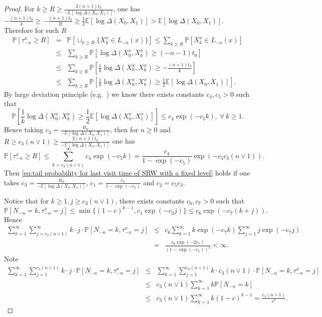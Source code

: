 \documentclass[12pt]{article}
\numberwithin{equation}{section}
\newcommand{\be}{\begin{equation}}
\newcommand{\ee}{\end{equation}}
\newcommand{\1}{\mathbf{1}}
\begin{document}
\begin{proof}
 	For $k\geq R\geq \frac{2(n+1)t_0}{-\mathbb{E}[\log\Delta(X_0,X_1)]}$, one has $-\frac{(n+1)t_0}{k}\geq -\frac{(n+1)t_0}{R}\geq \frac{1}{2}\mathbb{E}[\log\Delta(X_0,X_1)]>\mathbb{E}[\log\Delta(X_0,X_1)]$. Therefore
 	for such $R$
 	\begin{eqnarray*}
 		\mathbb{P}[\tau_{-n}^x\geq R]&=&\mathbb{P}[\cup_{k\geq R}\{ X_{k}^x\in L_{-n}(x) \}]\leq\sum_{k\geq R}\mathbb{P}[X_{k}^x\in L_{-n}(x)]\\
 		&\leq&\sum_{k\geq R}\mathbb{P}[\log\Delta(X_0^x,X_k^x)\geq (-n-1)t_0]\\
 		&\leq&\sum_{k\geq R}\mathbb{P}\left[\frac{1}{k}\log\Delta(X_0^x,X_k^x)\geq -\frac{(n+1)t_0}{k}\right]\\
 		&\leq&\sum_{k\geq R}\mathbb{P}\left[\frac{1}{k}\log\Delta(X_0^x,X_k^x)\geq \frac{1}{2}\mathbb{E}[\log\Delta(X_0,X_1)]\right].
 	\end{eqnarray*}
 	By large deviation principle (e.g.\ \cite[Theorem 2.7.7]{Durrett2010}) we know there exists constants $c_4,c_5>0$ such that 
 	\be
 	\mathbb{P}\left[\frac{1}{k}\log\Delta(X_0^x,X_k^x)\geq \frac{1}{2}\mathbb{E}[\log\Delta(X_0^x,X_1^x)]\right]
 	\leq c_4\exp(-c_5k),\ \forall \ k\geq1.
 	\ee
 	Hence taking $c_3=\frac{4t_0}{-\mathbb{E}[\log\Delta(X_0,X_1)]}$, then for $n\geq0$ and $R\geq c_3(n\vee 1)\geq \frac{2(n+1)t_0}{-\mathbb{E}[\log\Delta(X_0,X_1)]}$ one has 
 	\be 
 	\mathbb{P}[\tau_{-n}^x\geq R]\leq \sum_{k=c_3(n\vee1)}^{\infty} c_4\exp(-c_5k) =\frac{c_4}{1-\exp(-c_5)}\exp(-c_5c_3(n\vee 1)).
 	\ee
 	Then \eqref{eq:tail probability for last visit time of SRW with a fixed level} holds if one takes $c_3=\frac{4t_0}{-\mathbb{E}[\log\Delta(X_0,X_1)]}$, $c_1=\frac{c_4}{1-\exp(-c_5)}$ and $c_2=c_5c_3$. 
 	
 	
 	
 	Notice that for $k\geq 1,j\geq c_3(n\vee 1)$, there exists  constants $c_6,c_7>0$ such that 
 	\be\label{eq: exponential decay for N_-n,tau-n large}
 	\mathbb{P}[N_{-n}=k,\tau_{-n}^x=j]\leq \min\{(1-c)^{k-1},c_1\exp(-c_2j) \}\leq c_6\exp(-c_7(k+j)).
 	\ee
 	Hence 
 	\begin{eqnarray}\label{eq: tau large part}
 	\sum_{k=1}^{\infty}\sum_{j=c_3(n\vee1)}^{\infty}k\cdot j\cdot \mathbb{P}[N_{-n}=k,\tau_{-n}^x=j]&\leq& c_6\sum_{k=1}^{\infty}k\exp(-c_7k)\sum_{j=1}^{\infty}j\exp(-c_7j)\nonumber\\
 	&=&\frac{c_6\exp(-2c_7)}{(1-\exp(-c_7))^4}<\infty.
 	\end{eqnarray}
 Note 
 \begin{eqnarray}\label{eq: tau small part}
 \sum_{k=1}^{\infty}\sum_{j=1}^{c_3(n\vee 1)}k\cdot j\cdot \mathbb{P}[N_{-n}=k,\tau_{-n}^x=j]&\leq&
 \sum_{k=1}^{\infty}\sum_{j=1}^{c_3(n\vee 1)}k\cdot c_3(n\vee 1)\cdot \mathbb{P}[N_{-n}=k,\tau_{-n}^x=j]\nonumber\\
 &\leq&c_3(n\vee 1)\sum_{k=1}^{\infty}k\mathbb{P}[N_{-n}=k]\nonumber\\
 &\leq &c_3(n\vee 1)\sum_{k=1}^{\infty}k(1-c)^{k-1}=\frac{c_3(n\vee 1)}{c^2}.
 \end{eqnarray}
 

\end{proof}
\end{document}

